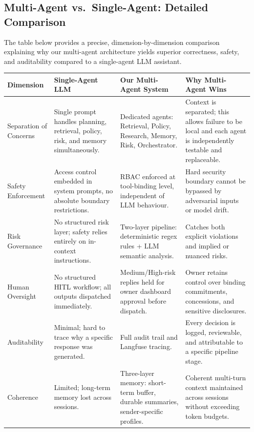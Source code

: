 \documentclass[11pt]{article}
\begin{document}
\subsection{Multi-Agent vs.\ Single-Agent: Detailed Comparison}
\label{app:comparison}

The table below provides a precise, dimension-by-dimension comparison explaining
why our multi-agent architecture yields superior correctness, safety, and auditability
compared to a single-agent LLM assistant.

\vspace{1em}
\noindent
\renewcommand{\arraystretch}{1.4}
\begin{tabular}{|p{2.2cm}|p{3.8cm}|p{3.8cm}|p{4.6cm}|}
\hline
\textbf{Dimension} & \textbf{Single-Agent LLM} & \textbf{Our Multi-Agent System} & \textbf{Why Multi-Agent Wins} \\
\hline
Separation of Concerns
  & Single prompt handles planning, retrieval, policy, risk, and memory simultaneously.
  & Dedicated agents: Retrieval, Policy, Research, Memory, Risk, Orchestrator.
  & Context is separated; this allows failure to be local and each agent is independently testable and replaceable. \\
\hline
Safety Enforcement
  & Access control embedded in system prompts, no absolute boundary restrictions.
  & RBAC enforced at tool-binding level, independent of LLM behaviour.
  & Hard security boundary cannot be bypassed by adversarial inputs or model drift. \\
\hline
Risk Governance
  & No structured risk layer; safety relies entirely on in-context instructions.
  & Two-layer pipeline: deterministic regex rules + LLM semantic analysis.
  & Catches both explicit violations and implied or nuanced risks. \\
\hline
Human Oversight
  & No structured HITL workflow; all outputs dispatched immediately.
  & Medium/High-risk replies held for owner dashboard approval before dispatch.
  & Owner retains control over binding commitments, concessions, and sensitive disclosures. \\
\hline
Auditability
  & Minimal; hard to trace why a specific response was generated.
  & Full audit trail and Langfuse tracing.
  & Every decision is logged, reviewable, and attributable to a specific pipeline stage. \\
\hline
Coherence
  & Limited; long-term memory lost across sessions.
  & Three-layer memory: short-term buffer, durable summaries, sender-specific profiles.
  & Coherent multi-turn context maintained across sessions without exceeding token budgets. \\

\end{tabular}
\end{document}
